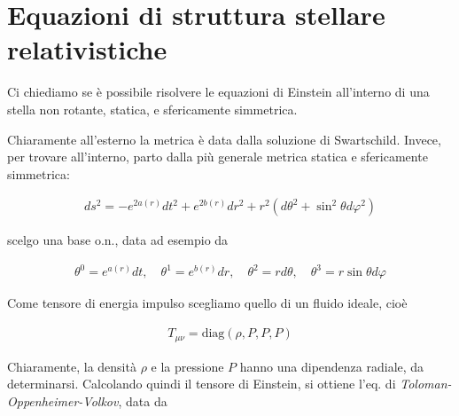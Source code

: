 \documentclass{report}
\begin{document}

\section{Equazioni di struttura stellare relativistiche}

Ci chiediamo se è possibile risolvere le equazioni di Einstein all'interno di una stella non rotante, statica, e sfericamente simmetrica. 

Chiaramente all'esterno la metrica è data dalla soluzione di Swartschild. Invece, per trovare all'interno, parto dalla più generale metrica statica e sfericamente simmetrica: 

\begin{align}
    ds^2 = -e^{2a(r)}dt^2 + e^{2b(r)}dr^2 + r^2(d\theta^2 + \sin^2\theta d\varphi^2)
\end{align}

scelgo una base o.n., data ad esempio da 

\begin{align}
    \theta^0 = e^{a(r)}dt, \quad \theta^1 = e^{b(r)}dr, \quad \theta^2 = rd\theta, \quad \theta^3 = r\sin\theta d\varphi
\end{align}

Come tensore di energia impulso scegliamo quello di un fluido ideale, cioè 

\begin{align}
    T_{\mu\nu} = \text{diag}(\rho, P, P, P)
\end{align}

Chiaramente, la densità \(\rho\) e la pressione \(P\) hanno una dipendenza radiale, da determinarsi. Calcolando quindi il tensore di Einstein, si ottiene l'eq. di \emph{Toloman-Oppenheimer-Volkov}, data da 
\end{document}
